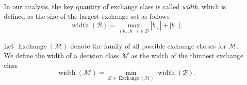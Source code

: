 \documentclass{article}
\newcommand{\wei}[1]{}
\newcommand{\wei}[1]{{\color{blue!50!black}  [\text{Wei:} #1]}}
\newcommand{\junk}[1]{}
\newcommand{\M}{\mathcal M}
\newcommand{\B}{\mathcal B}
\DeclareMathOperator{\rank}{width}
\DeclareMathOperator{\Exchange}{Exchange}
\begin{document}
In our analysis, the key quantity of exchange class is called \emph{width}, which is defined as the size of the largest exchange set as follows
\begin{equation}
\label{eq:width}
\rank(\B) = \max_{(b_+,b_-) \in \B} |b_+|+|b_-|.
\end{equation}
\junk{
Intuitively, for any feasible sets $M$ and $M'$, there exists an exchange set $(b_+,b_-)\in \B$ belonging to the exchange class $\B$ which can be seen as an ``operation'' that transforms $M$ one step towards $M'$: this operation generates a new feasible set $M\oplus b$ by removing elements (including $e$) from $M$ and adding elements which belongs to $M'$.
One can chain these operations together: for any $M\not= M'$, there exists a sequence of exchange sets $b_1,\ldots, b_k$ of $\B$ such that $M'=M\oplus b_1 \oplus \ldots \oplus b_k$.
}
\junk{
We notice that an exchange class $\B$ for $\M$ can be ``redundant''. 
It may contains some unnecessary exchange set $b$, such that $M\oplus b \not\in \M$ for any $M \in \M$.
These redundant exchange sets do not affect our analysis.
But allowing them would simplify the construction and description of exchange classes for certain combinatorial problems.
}
Let $\Exchange(\M)$ denote the family of all possible exchange classes for $\M$.
We define the width of a decision class $\M$ as the width of the thinnest exchange class
\begin{equation}
\label{eq:width-class}
\rank(\M) = \min_{\B \in \Exchange(\M)} \rank(\B).
\end{equation}
\end{document}
